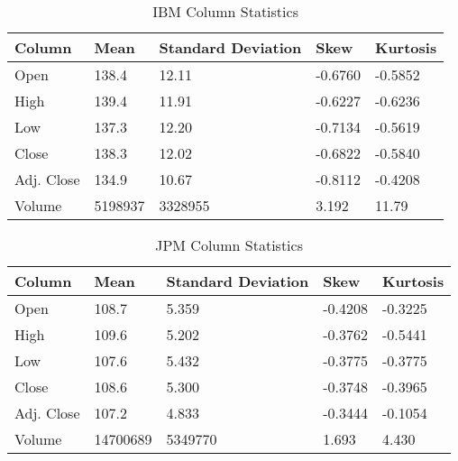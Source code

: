 \begin{table}[h]
    \centering
    \begin{tabular}{l|l|l|l|l}
    Column     & Mean     & Standard Deviation  & Skew    & Kurtosis  \\ \hline
    Open       & 138.4    & 12.11               & -0.6760 & -0.5852   \\ 
    High       & 139.4    & 11.91               & -0.6227 & -0.6236  \\ 
    Low        & 137.3    & 12.20               & -0.7134 & -0.5619  \\ 
    Close      & 138.3    & 12.02               & -0.6822 & -0.5840  \\ 
    Adj. Close & 134.9    & 10.67               & -0.8112 & -0.4208 \\
    Volume     & 5198937 & 3328955           & 3.192  & 11.79   
    \end{tabular}
    \caption{IBM Column Statistics}
    \label{table:part_4:IBM_stats}
\end{table}

\begin{table}[h]
    \centering
    \begin{tabular}{l|l|l|l|l}
    Column     & Mean     & Standard Deviation  & Skew    & Kurtosis  \\ \hline
    Open       & 108.7    & 5.359               & -0.4208 & -0.3225   \\ 
    High       & 109.6    & 5.202               & -0.3762 & -0.5441  \\ 
    Low        & 107.6    & 5.432               & -0.3775 & -0.3775  \\ 
    Close      & 108.6    & 5.300               & -0.3748 & -0.3965  \\ 
    Adj. Close & 107.2    & 4.833               & -0.3444 & -0.1054 \\
    Volume     & 14700689 & 5349770           & 1.693  & 4.430  
    \end{tabular}
    \caption{JPM Column Statistics}
    \label{table:part_4:JPM_stats}
\end{table}